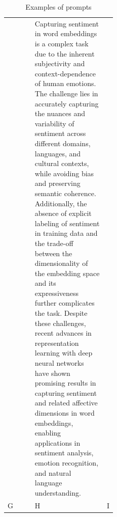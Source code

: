 \documentclass[11pt, a4paper]{amsart}
\begin{document}
\begin{table}[h]
\begin{tabularx}{\textwidth}{ p{0.25\linewidth} p{1.5cm} X }
		& Capturing sentiment in word embeddings is a complex task due to the inherent subjectivity and context-dependence of human emotions. The challenge lies in accurately capturing the nuances and variability of sentiment across different domains, languages, and cultural contexts, while avoiding bias and preserving semantic coherence. Additionally, the absence of explicit labeling of sentiment in training data and the trade-off between the dimensionality of the embedding space and its expressiveness further complicates the task. Despite these challenges, recent advances in representation learning with deep neural networks have shown promising results in capturing sentiment and related affective dimensions in word embeddings, enabling applications in sentiment analysis, emotion recognition, and natural language understanding.     \\ 
		G    & H      & I     \\ 
		\bottomrule
	\end{tabularx}
	\caption{Examples of prompts}
	\label{table:examples_of_prompts}
\end{table}
\end{document}
